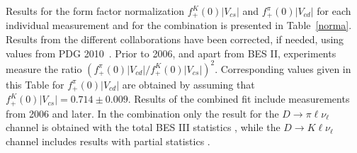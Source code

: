 
Results for the form factor normalization $f_+^K(0)|V_{cs}|$ and $f_+^{\pi}(0)|V_{cd}|$ for each individual measurement and for the combination 
is presented in Table~\ref{norma}. Results from the different collaborations have been corrected, if needed, using values from PDG 2010~\cite{PDG_2010}. 
Prior to 2006, and apart from BES II, experiments measure the ratio $(f_+^{\pi}(0)|V_{cd}| / f_+^K(0)|V_{cs}|)^2$. 
Corresponding values given in this Table for $f_+^{\pi}(0)|V_{cd}|$ are obtained by assuming that $f_+^K(0)|V_{cs}|=0.714\pm 0.009$.
Results of the combined fit include measurements from 2006 and later. %
In the combination only the result for the $D \to \pi \ell \nu_\ell $ channel is obtained 
with the total BES III statistics \cite{BESIII-new}, while the $D \to K \ell \nu_\ell $ 
channel includes results with partial statistics \cite{BESIII}.\;

